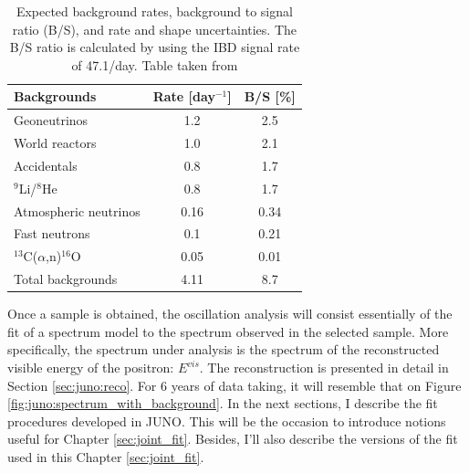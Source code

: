 \documentclass[../main.tex]{subfiles}
\begin{document}
\begin{table}[ht]
  \centering
  \begin{tabular}{l|c|c}
    \hline
    Backgrounds           & Rate [day$^{-1}$] & B/S [\%] \\
    \hline
    Geoneutrinos          & 1.2               & 2.5 \\
    World reactors        & 1.0               & 2.1 \\
    Accidentals           & 0.8               & 1.7 \\
    $^9$Li/$^8$He         & 0.8               & 1.7 \\
    Atmospheric neutrinos & 0.16              & 0.34 \\
    Fast neutrons         & 0.1               & 0.21 \\
    $^{13}$C($\alpha$,n)$^{16}$O & 0.05       & 0.01 \\
    \hline
    Total backgrounds     & 4.11              & 8.7 \\
    \hline
  \end{tabular}
  \caption{Expected background rates, background to signal ratio (B/S), and rate and shape uncertainties. The B/S ratio is calculated by using the IBD signal rate of 47.1/day. Table taken from \cite{abusleme_potential_2024}}
  \label{tab:juno:res_bg}
\end{table}

Once a sample is obtained, the oscillation analysis will consist essentially of the fit of a spectrum model to the spectrum observed in the selected sample. More specifically, the spectrum under analysis is the spectrum of the reconstructed visible energy of the positron: $E^{vis}$.
The reconstruction is presented in detail in Section \ref{sec:juno:reco}. For 6 years of data taking, it will resemble that on Figure \ref{fig:juno:spectrum_with_background}. In the next sections, I describe the fit procedures developed in JUNO. This will be the occasion to introduce notions useful for Chapter \ref{sec:joint_fit}. Besides, I'll also describe the versions of the fit used in this Chapter \ref{sec:joint_fit}.

%
%
%
\end{document}
